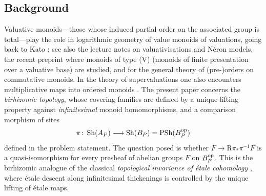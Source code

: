 \documentclass[11pt]{amsart}
\theoremstyle{plain}
\theoremstyle{remark}
\theoremstyle{definition}
\numberwithin{equation}{section}
\begin{document}
\subsection{Background}
Valuative monoids---those whose induced partial order on the associated
group is total---play the role in logarithmic geometry of value monoids of
valuations, going back to Kato \cite{Kat89}; see also the lecture notes
\cite{HolmesNotes} on valuativisations and N\'eron models, the recent
preprint \cite{ArxivV} where monoids of type (V) (monoids of finite
presentation over a valuative base) are studied, and \cite{Preorders} for
the general theory of (pre-)orders on commutative monoids.  In the theory
of supervaluations one also encounters multiplicative maps into ordered
monoids \cite{IKR}.  The present paper concerns the \emph{birhizomic
topology}, whose covering families are defined by a unique lifting
property against \emph{infinitesimal} monoid homomorphisms, and a
comparison morphism of sites
\[
\pi\colon \operatorname{Sh}(A_P)\longrightarrow
\operatorname{Sh}(B_P)=\operatorname{PSh}(B_P^{\rm op})
\]
defined in the problem statement.  The question posed is whether
$F\to\mathrm R\pi_*\pi^{-1}F$ is a quasi-isomorphism for every presheaf
of abelian groups $F$ on $B_P^{\rm op}$.  This is the birhizomic analogue
of the classical \emph{topological invariance of \'etale cohomology}
\cite[Exp.~VIII]{SGA4}, where \'etale descent along infinitesimal
thickenings is controlled by the unique lifting of \'etale maps.
\end{document}
